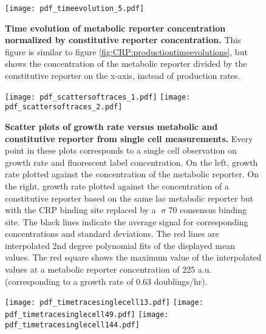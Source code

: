 \begin{figure}%
	\centering
	\texttt{[image: pdf\_timeevolution\_5.pdf]}
	\caption{ 
		\textbf{Time evolution of metabolic reporter concentration normalized by constitutive reporter concentration.}
		This figure is similar to figure \ref{fig:CRP:productiontimeevolutions}, but shows the concentration of the metabolic reporter divided by the constitutive reporter on the x-axis, instead of production rates.
	}
	\label{fig:CRP:normalizedconcentrationtimeevolutions}
\end{figure}%



\begin{figure}%
	\centering
	\texttt{[image: pdf\_scattersoftraces\_1.pdf]}
	\texttt{[image: pdf\_scattersoftraces\_2.pdf]}	
	\caption{ 
		\textbf{Scatter plots of growth rate versus metabolic and constitutive reporter from single cell measurements.}
		Every point in these plots corresponds to a single cell observation on growth rate and fluorescent label concentration.
		On the left, growth rate plotted against the concentration of the metabolic reporter.
		On the right, growth rate plotted against the concentration of a constitutive reporter based on the same lac metabolic reporter but with the CRP binding site replaced by a $\upsigma$70 consensus binding site.
		The black lines indicate the average signal for corresponding concentrations and standard deviations.
		The red lines are interpolated 2nd degree polynomial fits of the displayed mean values.
		The red square shows the maximum value of the interpolated values at a metabolic reporter concentration of 225 a.u. (corresponding to a growth rate of 0.63 doublings/hr).
	}
	\label{fig:CRP:scatterspulsing}
\end{figure}%


\begin{figure}%
	\centering
	\texttt{[image: pdf\_timetracesinglecell13.pdf]}
	\texttt{[image: pdf\_timetracesinglecell49.pdf]}
	\texttt{[image: pdf\_timetracesinglecell144.pdf]}
	\clearpage %
	\label{fig:CRP:timevolutionCRPgrowthsinglecell}
\end{figure}	

